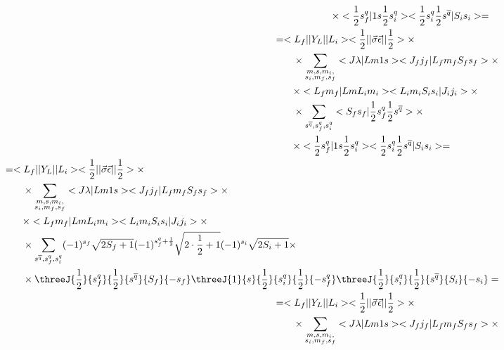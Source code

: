 \begin{align}
\begin{split}
        &\qquad\times <\frac{1}{2} s_f^q| 1 s \frac{1}{2} s_i^q> <\frac{1}{2} s_i^{q} \frac{1}{2} s^{\overline{q}} |S_i s_i> =
    \end{split}\\
    \begin{split}
        &= <L_f|| Y_L ||L_i> <\frac{1}{2}|| \vec{\sigma}\vec{\epsilon} ||\frac{1}{2}> \times \\
        &\qquad\times \sum_{\substack{m, s, m_i,\\ s_i, m_f, s_f}} <J \lambda| L m 1 s> <J_f j_f| L_f m_f S_f s_f> \times \\
        &\qquad\times <L_f m_f| L m L_i m_i> <L_i m_i S_i s_i| J_i j_i> \times \\
        &\qquad\times \sum_{s^{\overline{q}}, s_{f}^{q}, s_i^q} <S_f s_f| \frac{1}{2} s_f^{q} \frac{1}{2} s^{\overline{q}}> \times \\
        &\qquad\times <\frac{1}{2} s_f^q| 1 s \frac{1}{2} s_i^q> <\frac{1}{2} s_i^{q} \frac{1}{2} s^{\overline{q}} |S_i s_i> =
    \end{split}\\
    \begin{split}
        &= <L_f|| Y_L ||L_i> <\frac{1}{2}|| \vec{\sigma}\vec{\epsilon} ||\frac{1}{2}> \times \\
        &\qquad\times \sum_{\substack{m, s, m_i,\\ s_i, m_f, s_f}} <J \lambda| L m 1 s> <J_f j_f| L_f m_f S_f s_f> \times \\
        &\qquad\times <L_f m_f| L m L_i m_i> <L_i m_i S_i s_i| J_i j_i> \times \\
        &\qquad\times \sum_{s^{\overline{q}}, s_{f}^{q}, s_i^q} (-1)^{s_f}\sqrt{2S_f+1} (-1)^{s_f^q + \frac{1}{2}}\sqrt{2 \cdot \frac{1}{2} + 1} (-1)^{s_i} \sqrt{2S_i + 1} \times \\
        &\qquad\times \threeJ{\frac{1}{2}}{s_f^q}{\frac{1}{2}}{s^{\overline{q}}}{S_f}{-s_f} \threeJ{1}{s}{\frac{1}{2}}{s_i^q}{\frac{1}{2}}{-s_f^q} \threeJ{\frac{1}{2}}{s_i^q}{\frac{1}{2}}{s^{\overline{q}}}{S_i}{-s_i}  =
    \end{split}\\
    \begin{split}
        &= <L_f|| Y_L ||L_i> <\frac{1}{2}|| \vec{\sigma}\vec{\epsilon} ||\frac{1}{2}> \times \\
        &\qquad\times \sum_{\substack{m, s, m_i,\\ s_i, m_f, s_f}} <J \lambda| L m 1 s> <J_f j_f| L_f m_f S_f s_f> \times \\

\end{split}
\end{align}
